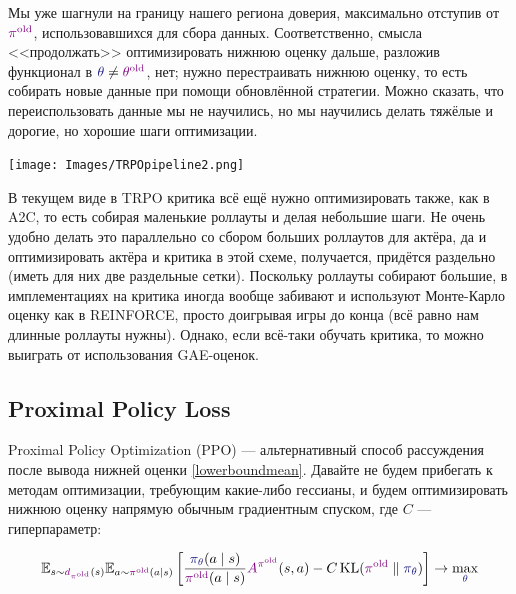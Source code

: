 Мы уже шагнули на границу нашего региона доверия, максимально отступив от $\textcolor{ChadPurple}{\pi^{\old}}$, использовавшихся для сбора данных. Соответственно, смысла <<продолжать>> оптимизировать нижнюю оценку дальше, разложив функционал в $\textcolor{ChadBlue}{\theta} \ne \textcolor{ChadPurple}{\theta^{\old}}$, нет; нужно перестраивать нижнюю оценку, то есть собирать новые данные при помощи обновлённой стратегии. Можно сказать, что переиспользовать данные мы не научились, но мы научились делать тяжёлые и дорогие, но хорошие шаги оптимизации. 

\vspace{0.4cm}
\begin{center}
\texttt{[image: Images/TRPOpipeline2.png]}
\end{center}

\begin{remark}
В текущем виде в TRPO критика всё ещё нужно оптимизировать также, как в A2C, то есть собирая маленькие роллауты и делая небольшие шаги. Не очень удобно делать это параллельно со сбором больших роллаутов для актёра, да и оптимизировать актёра и критика в этой схеме, получается, придётся раздельно (иметь для них две раздельные сетки). Поскольку роллауты собирают большие, в имплементациях на критика иногда вообще забивают и используют Монте-Карло оценку как в REINFORCE, просто доигрывая игры до конца (всё равно нам длинные роллауты нужны). Однако, если всё-таки обучать критика, то можно выиграть от использования GAE-оценок.
\end{remark}

\subsection{Proximal Policy Loss}

Proximal Policy Optimization (PPO) --- альтернативный способ рассуждения после вывода нижней оценки \eqref{lowerboundmean}. Давайте не будем прибегать к методам оптимизации, требующим какие-либо гессианы, и будем оптимизировать нижнюю оценку напрямую обычным градиентным спуском, где $C$ --- гиперпараметр:

\begin{equation}\label{lowerboundunconstrained}
\E_{s \sim \textcolor{ChadPurple}{d_{\pi^{\old}}}(s)} \E_{a \sim \textcolor{ChadPurple}{\pi^{\old}}(a \mid s)} \left[ \frac{\textcolor{ChadBlue}{\pi_\theta}(a \mid s)}{\textcolor{ChadPurple}{\pi^{\old}}(a \mid s)} \textcolor{ChadPurple}{A^{\pi^{\old}}}(s, a) - C \KL(\textcolor{ChadPurple}{\pi^{\old}} \parallel \textcolor{ChadBlue}{\pi_\theta}) \right] \to \max_{\textcolor{ChadBlue}{\theta}}
\end{equation}


